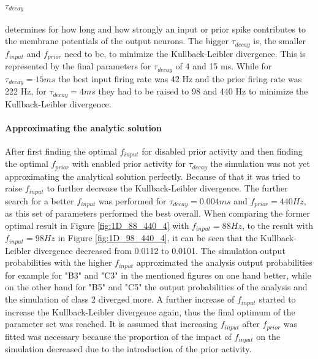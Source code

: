 \paragraph{$\tau_{decay}$} determines for how long and how strongly an input or prior spike contributes to the membrane potentials of the output neurons. The bigger $\tau_{decay}$ is, the smaller $f_{input}$ and $f_{prior}$ need to be, to minimize the Kullback-Leibler divergence. This is represented by the final parameters for $\tau_{decay}$ of 4 and 15 ms. While for $\tau_{decay} = 15 ms$ the best input firing rate was 42 Hz and the prior firing rate was 222 Hz, for $\tau_{decay} = 4 ms$ they had to be raised to 98 and 440 Hz to minimize the Kullback-Leibler divergence.

\paragraph{Approximating the analytic solution}
After first finding the optimal $f_{input}$ for disabled prior activity and then finding the optimal $f_{prior}$ with enabled prior activity for $\tau_{decay}$ the simulation was not yet approximating the analytical solution perfectly. Because of that it was tried to raise $f_{input}$ to further decrease the Kullback-Leibler divergence. The further search for a better $f_{input}$ was performed for $\tau_{decay} = 0.004 ms$ and $f_{prior} = 440 Hz$, as this set of parameters performed the best overall.
When comparing the former optimal result in Figure \ref{fig:1D_88_440_4} with $f_{input} = 88 Hz$, to the result with $f_{input} = 98 Hz$ in Figure \ref{fig:1D_98_440_4}, it can be seen that the Kullback-Leibler divergence decreased from 0.0112 to 0.0101. The simulation output probabilities with the higher $f_{input}$ approximated the analysis output probabilities for example for "B3" and "C3" in the mentioned figures on one hand better, while on the other hand for "B5" and "C5" the output probabilities of the analysis and the simulation of class 2 diverged more. A further increase of $f_{input}$ started to increase the Kullback-Leibler divergence again, thus the final optimum of the parameter set was reached. It is assumed that increasing $f_{input}$ after $f_{prior}$ was fitted was necessary because the proportion of the impact of $f_{input}$ on the simulation decreased due to the introduction of the prior activity.
